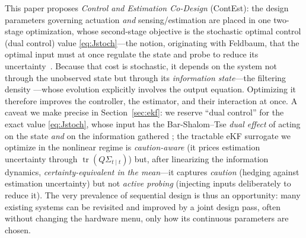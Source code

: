 \documentclass[twocolumn,amsthm]{autart}
\begin{document}
This paper proposes \emph{Control and Estimation Co-Design} (ContEst): the
design parameters governing actuation \emph{and} sensing/estimation are placed
in one two-stage optimization, whose second-stage objective is the stochastic
optimal control (dual control) value \eqref{eq:Jstoch}---the notion, originating
with Feldbaum, that the optimal input must at once regulate the state and probe to
reduce its uncertainty~\cite{feldbaum1960dual,bar1974dual,mesbah2018stochastic}. Because that cost is
stochastic, it depends on the system not through the unobserved state but through
its \emph{information state}---the filtering density
\cite{kumar2015stochastic}---whose evolution explicitly involves the output
equation. Optimizing it therefore improves the controller, the estimator, and
their interaction at once. A caveat we make precise in
Section~\ref{sec:ekf}: we reserve ``dual control'' for the exact value
\eqref{eq:Jstoch}, whose input has the Bar-Shalom--Tse \emph{dual effect} of
acting on the state \emph{and} on the information gathered
\cite{bar1974dual,mesbah2018stochastic}; the tractable eKF surrogate we optimize
in the nonlinear regime is \emph{caution-aware} (it prices estimation uncertainty
through $\operatorname{tr}(Q\Sigma_{t\mid t})$) but, after linearizing the
information dynamics, \emph{certainty-equivalent in the mean}---it captures
\emph{caution} (hedging against estimation uncertainty) but not \emph{active
probing} (injecting inputs deliberately to reduce it). The very prevalence of sequential
design is thus an opportunity: many existing systems can be revisited and
improved by a joint design pass, often without changing the hardware menu, only
how its continuous parameters are chosen.
\end{document}
